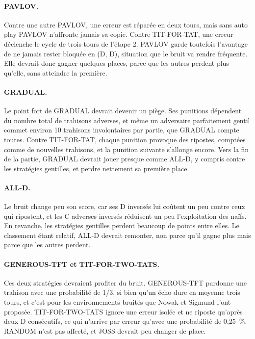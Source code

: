 \documentclass[11pt,a4paper]{article}
\begin{document}
\paragraph{PAVLOV.} Contre une autre PAVLOV, une erreur est réparée en deux tours, mais sans auto play PAVLOV n'affronte jamais
sa copie. Contre TIT-FOR-TAT, une erreur déclenche le cycle de trois tours de l'étape 2. PAVLOV garde toutefois l'avantage de ne
jamais rester bloquée en (D, D), situation que le bruit va rendre fréquente. Elle devrait donc gagner quelques places, parce
que les autres perdent plus qu'elle, sans atteindre la première.

\paragraph{GRADUAL.} Le point fort de GRADUAL devrait devenir un piège. Ses punitions dépendent du nombre total de trahisons
adverses, et même un adversaire parfaitement gentil commet environ 10 trahisons involontaires par partie, que GRADUAL compte
toutes. Contre TIT-FOR-TAT, chaque punition provoque des ripostes, comptées comme de nouvelles trahisons, et la punition
suivante s'allonge encore. Vers la fin de la partie, GRADUAL devrait jouer presque comme ALL-D, y compris contre les stratégies
gentilles, et perdre nettement sa première place.

\paragraph{ALL-D.} Le bruit change peu son score, car ses D inversés lui coûtent un peu contre ceux qui ripostent, et les C
adverses inversés réduisent un peu l'exploitation des naïfs. En revanche, les stratégies gentilles perdent beaucoup de points
entre elles. Le classement étant relatif, ALL-D devrait remonter, non parce qu'il gagne plus mais parce que les autres perdent.

\paragraph{GENEROUS-TFT et TIT-FOR-TWO-TATS.} Ces deux stratégies devraient profiter du bruit. GENEROUS-TFT pardonne une
trahison avec une probabilité de 1/3, si bien qu'un écho dure en moyenne trois tours, et c'est pour les environnements bruités
que Nowak et Sigmund l'ont proposée. TIT-FOR-TWO-TATS ignore une erreur isolée et ne riposte qu'après deux D consécutifs, ce
qui n'arrive par erreur qu'avec une probabilité de 0,25~\%. RANDOM n'est pas affecté, et JOSS devrait peu changer de place.
\end{document}
